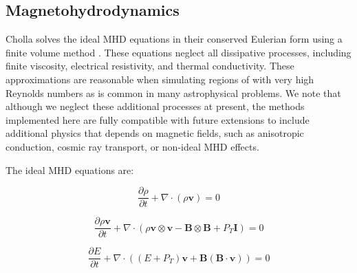 \documentclass[modern, linenumbers]{aastex631}
\begin{document}

\subsection{Magnetohydrodynamics}
\label{sec:methods-mhd}

Cholla solves the ideal MHD equations in their conserved Eulerian form using a finite volume method \citep{Godunov}. These equations neglect all dissipative processes, including finite viscosity, electrical resistivity, and thermal conductivity. These approximations are reasonable when simulating regions of with very high Reynolds numbers as is common in many astrophysical problems. We note that although we neglect these additional processes at present, the methods implemented here are fully compatible with future extensions to include additional physics that depends on magnetic fields, such as anisotropic conduction, cosmic ray transport, or non-ideal MHD effects.

The ideal MHD equations are:

\begin{equation}
    \label{eqn:mass-conservation}
    \frac{\partial \rho}{\partial t} + \nabla \cdot (\rho \boldsymbol{v}) = 0
\end{equation}

\begin{equation}
    \label{eqn:momentum-conservation}
    \frac{\partial \rho\boldsymbol{v}}{\partial t} + \nabla \cdot (\rho \boldsymbol{v}\otimes\boldsymbol{v} - \boldsymbol{B}\otimes\boldsymbol{B} + P_T\boldsymbol{I}) = 0
\end{equation}

\begin{equation}
    \label{eqn:energy-conservation}
    \frac{\partial E}{\partial t} + \nabla \cdot ( (E + P_T) \boldsymbol{v} + \boldsymbol{B}(\boldsymbol{B}\cdot\boldsymbol{v}) ) = 0
\end{equation}
\end{document}
